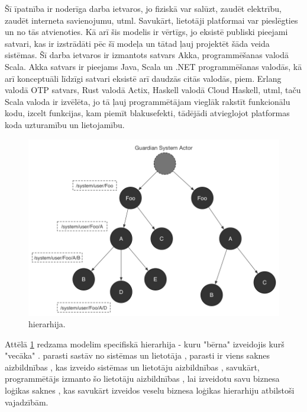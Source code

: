 Šī īpatnība ir noderīga darba ietvaros, jo fiziskā 
var salūzt, zaudēt elektrību, zaudēt interneta savienojumu, utml. Savukārt,
lietotāji platformai var pieslēgties un no tās atvienoties. Kā arī šis modelis
ir vērtīgs, jo eksistē publiski pieejami satvari, kas ir izstrādāti pēc šī
modeļa un tātad ļauj projektēt šāda veida sistēmas. Šī darba ietvaros ir
izmantots satvars Akka, programmēšanas valodā Scala. Akka satvars ir pieejams
Java, Scala un .NET programmēšanas valodās, kā arī konceptuāli līdzīgi satvari
eksistē arī daudzās citās valodās, piem. Erlang valodā OTP satvars, Rust valodā
Actix, Haskell valodā Cloud Haskell, utml, taču Scala valoda ir izvēlēta, jo tā
ļauj programmētājam vieglāk rakstīt funkcionālu kodu, izcelt funkcijas, kam
piemīt blakusefekti, tādējādi atvieglojot platformas koda uzturamību un
lietojamību. 

\begin{figure}[H]
    \includegraphics[width=0.5\linewidth]{assets/akka-actor-hierarchy-gray.png}
    \centering
    \caption{ hierarhija.
    \cite[sl. 34]{MarkusJuraAkka}}
    \label{fig:actorsystem}
\end{figure}

Attēlā \ref{fig:actorsystem} redzama  modelim specifiskā
 hierarhija - kuru "bērna"
 izveidojis kurš "vecāka" .
 parasti sastāv no sistēmas
 un lietotāja , parasti ir
viens saknes aizbildnības , kas izveido sistēmas un
lietotāju aizbildnības , savukārt, programmētājs
izmanto šo lietotāju aizbildnības , lai izveidotu savu
biznesa loģikas saknes , kas savukārt izveidos veselu
biznesa loģikas  hierarhiju atbilstoši vajadzībām.
\cite[para. The Akka actor hierarchy]{LightbendAkka2619}

